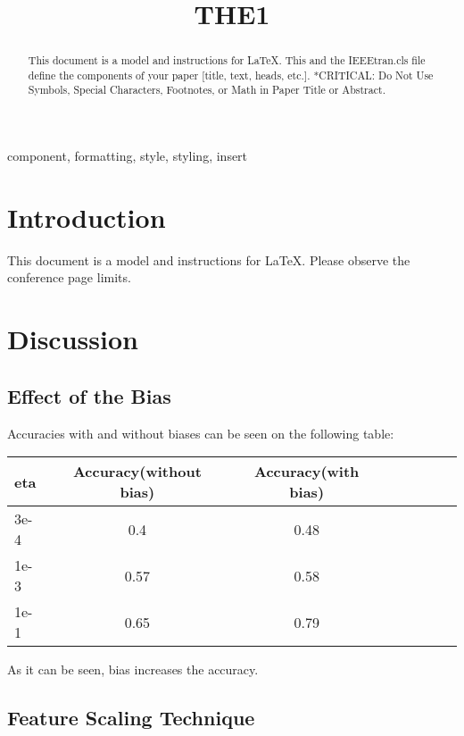 \documentclass[conference]{IEEEtran}
\begin{document}
\title{THE1\\
}

\author{
}

\maketitle

\begin{abstract}
This document is a model and instructions for \LaTeX.
This and the IEEEtran.cls file define the components of your paper [title, text, heads, etc.]. *CRITICAL: Do Not Use Symbols, Special Characters, Footnotes, 
or Math in Paper Title or Abstract.
\end{abstract}

\begin{IEEEkeywords}
component, formatting, style, styling, insert
\end{IEEEkeywords}

\section{Introduction}
This document is a model and instructions for \LaTeX.
Please observe the conference page limits. 

\section{Discussion}

\subsection{Effect of the Bias}

Accuracies with and without biases can be seen on the following table:

\begin{tabular}{l*{6}{c}r}
eta  & Accuracy(without bias) & Accuracy(with bias) \\
\hline
3e-4 & 0.4 & 0.48 \\
1e-3 & 0.57 & 0.58 \\
1e-1 & 0.65 & 0.79 \\
\end{tabular}

As it can be seen, bias increases the accuracy.

\subsection{Feature Scaling Technique}
\end{document}
